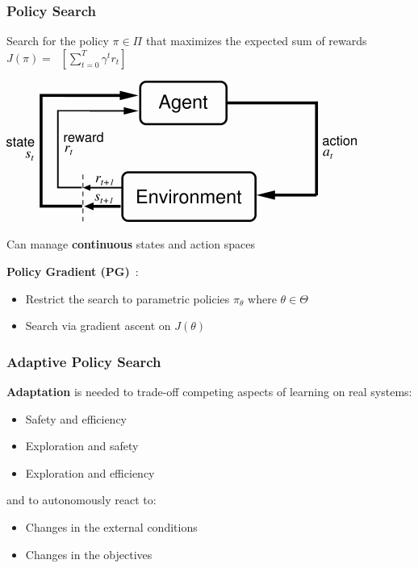 \documentclass{beamer}
\begin{document}
\begin{frame}
\frametitle{Policy Search \cite{deisenroth2013survey}}

Search for the policy $\pi \in \Pi$ that maximizes the expected sum of rewards ${J(\pi) = \mathop{E_{\pi}}\left[\sum_{t=0}^{T}\gamma^tr_t\right]}$

\vfill

\begin{center}
\includegraphics[width=.5\textwidth]{pics/rl.png}
\end{center}

\vfill

Can manage \textbf{continuous} states and action spaces

\vfill

\textbf{Policy Gradient (PG)}~\cite{sutton2000policy}:
\begin{itemize}
	\item Restrict the search to parametric policies $\pi_{\theta}$ where $\theta \in \Theta$
	\item Search via gradient ascent on $J(\theta)$
\end{itemize}

\end{frame}


\begin{frame}
\frametitle{Adaptive Policy Search}

\textbf{Adaptation} is needed to trade-off competing aspects of learning on real systems:

\vspace{5pt}

\begin{itemize}
	\item Safety and efficiency
	\item Exploration and safety
	\item Exploration and efficiency
\end{itemize}

\vfill

and to autonomously react to:

\vspace{5pt}

\begin{itemize}
	\item Changes in the external conditions
	\item Changes in the objectives
\end{itemize}

\end{frame}
\end{document}
